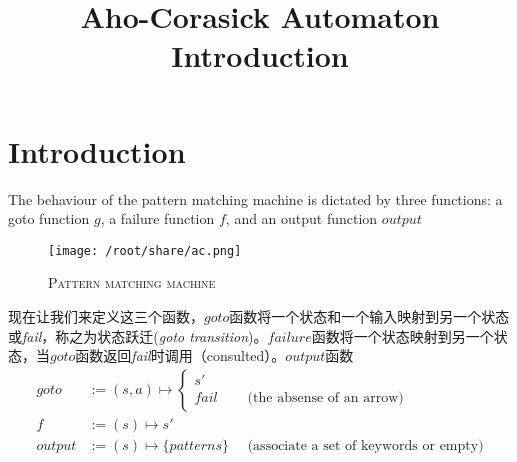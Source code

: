 \documentclass{article}
\begin{document}
\title{Aho-Corasick Automaton Introduction}
\author{}
\maketitle

\section{Introduction}
The behaviour of the pattern matching machine is dictated by three functions: a goto function $g$, a failure function $f$, and an output function $output$

\begin{figure}[h]
  \centering
\caption{\textsc{Pattern matching machine}}
\texttt{[image: /root/share/ac.png]}
\end{figure}

现在让我们来定义这三个函数，$goto$函数将一个状态和一个输入映射到另一个状态或\emph{fail}，称之为状态跃迁(\textit{goto transition})。$failure$函数将一个状态映射到另一个状态，当$goto$函数返回\emph{fail}时调用（consulted）。$output$函数
\begin{align*}
goto    &:= (s,a) \mapsto
\begin{cases}
 s' \\
fail & \quad \text{ (the absense of an arrow)}
\end{cases}\\
f       &:= (s) \mapsto s'\\
output  &:= (s) \mapsto \{patterns\} \quad \text{ (associate a set of keywords or empty)}\\
\end{align*}
\end{document}

